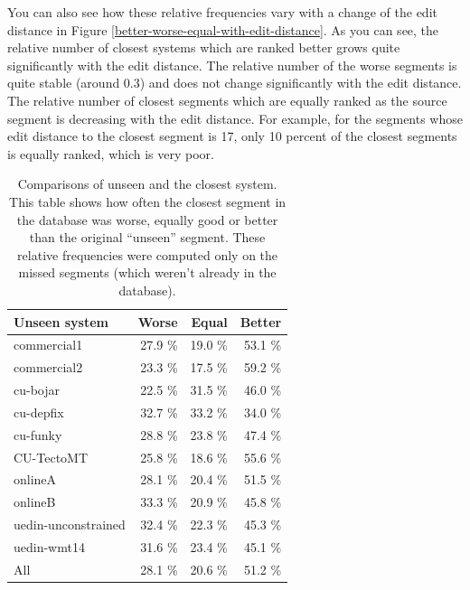 You can also see how these relative frequencies vary with a change of the edit
distance in Figure \ref{better-worse-equal-with-edit-distance}.  As you can
see, the relative number of closest systems which are ranked better grows quite
significantly with the edit distance. The relative number of the worse segments
is quite stable (around 0.3) and does not change significantly with the edit
distance. The relative number of closest segments which are equally ranked as
the source segment is decreasing with the edit distance. For example, for the
segments whose edit distance to the closest segment is 17, only 10 percent of
the closest segments is equally ranked, which is very poor. 


\begin{table}
  \centering
\begin{tabular}{|lrrr|}
  \hline
  \textbf{Unseen system}            &   \textbf{Worse} &   \textbf{Equal} &   \textbf{Better} \\
  \hline
   commercial1         &   27.9 \% &   19.0 \% &    53.1 \% \\
   commercial2         &   23.3 \% &   17.5 \% &    59.2 \% \\
   cu-bojar            &   22.5 \% &   31.5 \% &    46.0 \% \\
   cu-depfix           &   32.7 \% &   33.2 \% &    34.0 \% \\
   cu-funky            &   28.8 \% &   23.8 \% &    47.4 \% \\
   CU-TectoMT          &   25.8 \% &   18.6 \% &    55.6 \% \\
   onlineA             &   28.1 \% &   20.4 \% &    51.5 \% \\
   onlineB             &   33.3 \% &   20.9 \% &    45.8 \% \\
   uedin-unconstrained &   32.4 \% &   22.3 \% &    45.3 \% \\
   uedin-wmt14         &   31.6 \% &   23.4 \% &    45.1 \% \\
  \hline
   All               &   28.1 \% &   20.6 \% &    51.2 \% \\
  \hline
\end{tabular}

\caption[Comparisons of unseen and the closest systems]{Comparisons of unseen
and the closest system. This table shows how often the closest segment in the
database was worse, equally good or better than the original ``unseen''
segment. These relative frequencies were computed only on the missed segments
(which weren't already in the database).}

  \label{edit-distance-matching-analysis}
\end{table}

